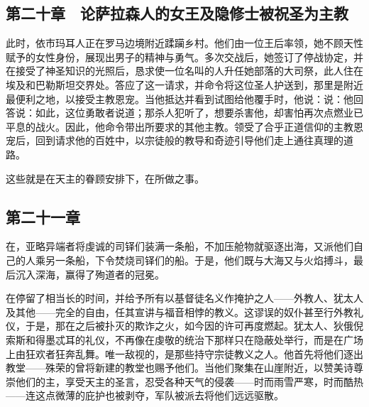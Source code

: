 
\subsection{第二十章　论萨拉森人的女王及隐修士被祝圣为主教}

此时，依市玛耳人正在罗马边境附近蹂躏乡村。他们由一位王后率领，她不顾天性赋予的女性身份，展现出男子的精神与勇气。多次交战后，她签订了停战协定，并在接受了神圣知识的光照后，恳求使一位名叫的人升任她部落的大司祭，此人住在埃及和巴勒斯坦交界处。答应了这一请求，并命令将这位圣人护送到，那里是附近最便利之地，以接受主教恩宠。当他抵达并看到试图给他覆手时，他说：说：他回答说：如此，这位勇敢者说道；那杀人犯听了，想要杀害他，却害怕再次点燃业已平息的战火。因此，他命令带出所要求的其他主教。领受了合乎正道信仰的主教恩宠后，回到请求他的百姓中，以宗徒般的教导和奇迹引导他们走上通往真理的道路。\par

这些就是在天主的眷顾安排下，在所做之事。\par


\subsection{第二十一章}

在，亚略异端者将虔诚的司铎们装满一条船，不加压舱物就驱逐出海，又派他们自己的人乘另一条船，下令焚烧司铎们的船。于是，他们既与大海又与火焰搏斗，最后沉入深海，赢得了殉道者的冠冕。\par

在停留了相当长的时间，并给予所有以基督徒名义作掩护之人——外教人、犹太人及其他——完全的自由，任其宣讲与福音相悖的教义。这谬误的奴仆甚至行外教礼仪，于是，那在之后被扑灭的欺诈之火，如今因的许可再度燃起。犹太人、狄俄倪索斯和得墨忒耳的礼仪，不再像在虔敬的统治下那样只在隐蔽处举行，而是在广场上由狂欢者狂奔乱舞。唯一敌视的，是那些持守宗徒教义之人。他首先将他们逐出教堂——殊荣的曾将新建的教堂也赐予他们。当他们聚集在山崖附近，以赞美诗尊崇他们的主，享受天主的圣言，忍受各种天气的侵袭——时而雨雪严寒，时而酷热——连这点微薄的庇护也被剥夺，军队被派去将他们远远驱散。\par

